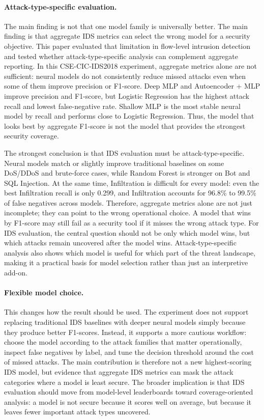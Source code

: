 \documentclass[sigconf,nonacm]{acmart}
\begin{document}
\paragraph{Attack-type-specific evaluation.}
The main finding is not that one model family is universally better.
The main finding is that aggregate IDS metrics can select the wrong model for a security objective.
This paper evaluated that limitation in flow-level intrusion detection and tested whether attack-type-specific analysis can complement aggregate reporting.
In this CSE-CIC-IDS2018 experiment, aggregate metrics alone are not sufficient: neural models do not consistently reduce missed attacks even when some of them improve precision or F1-score.
Deep MLP and Autoencoder + MLP improve precision and F1-score, but Logistic Regression has the highest attack recall and lowest false-negative rate.
Shallow MLP is the most stable neural model by recall and performs close to Logistic Regression.
Thus, the model that looks best by aggregate F1-score is not the model that provides the strongest security coverage.

The strongest conclusion is that IDS evaluation must be attack-type-specific.
Neural models match or slightly improve traditional baselines on some DoS/DDoS and brute-force cases, while Random Forest is stronger on Bot and SQL Injection.
At the same time, Infiltration is difficult for every model: even the best Infiltration recall is only 0.299, and Infiltration accounts for 96.8\% to 99.5\% of false negatives across models.
Therefore, aggregate metrics alone are not just incomplete; they can point to the wrong operational choice.
A model that wins by F1-score may still fail as a security tool if it misses the wrong attack type.
For IDS evaluation, the central question should not be only which model wins, but which attacks remain uncovered after the model wins.
Attack-type-specific analysis also shows which model is useful for which part of the threat landscape, making it a practical basis for model selection rather than just an interpretive add-on.

\paragraph{Flexible model choice.}
This changes how the result should be used.
The experiment does not support replacing traditional IDS baselines with deeper neural models simply because they produce better F1-scores.
Instead, it supports a more cautious workflow: choose the model according to the attack families that matter operationally, inspect false negatives by label, and tune the decision threshold around the cost of missed attacks.
The main contribution is therefore not a new highest-scoring IDS model, but evidence that aggregate IDS metrics can mask the attack categories where a model is least secure.
The broader implication is that IDS evaluation should move from model-level leaderboards toward coverage-oriented analysis: a model is not secure because it scores well on average, but because it leaves fewer important attack types uncovered.
\end{document}
